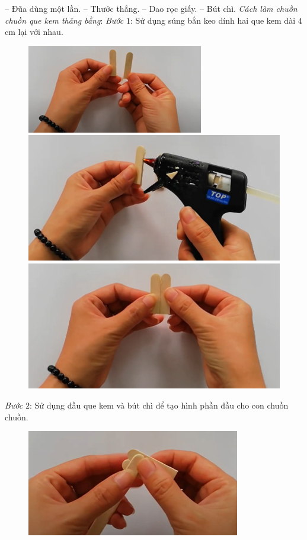 \begin{multicols}{2}
	\vskip 0.05cm
	-- Đũa dùng một lần.
	\vskip 0.05cm
	-- Thước thẳng.
	\vskip 0.05cm
	-- Dao rọc giấy.
	\vskip 0.05cm
	-- Bút chì.
	\vskip 0.05cm
	\textit{Cách làm chuồn chuồn que kem thăng bằng}:
	\vskip 0.1cm
	\textit{Bước} $1$: Sử dụng súng bắn keo dính hai que kem dài $4$ cm lại với nhau.
	\begin{figure}[H]
		\vspace*{-5pt}
		\centering
		\captionsetup{labelformat= empty, justification=centering}
		\includegraphics[width=0.7\linewidth]{11}
		
		\vspace*{1pt}
		\includegraphics[width=0.7\linewidth]{12}
		
		\vspace*{1pt}
		\hspace*{1pt}\includegraphics[width=0.7\linewidth]{13}
	\end{figure}
	\textit{Bước} $2$: Sử dụng đầu que kem và bút chì để tạo hình phần đầu cho con chuồn chuồn.
	\begin{figure}[H]
		\vspace*{-5pt}
		\centering
		\captionsetup{labelformat= empty, justification=centering}
		\includegraphics[width=0.7\linewidth]{14}
		

\end{figure}
\end{multicols}

